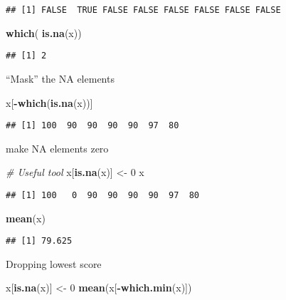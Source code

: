 \documentclass[
]{article}
\newenvironment{Shaded}{\begin{snugshade}}{\end{snugshade}}
\newcommand{\CommentTok}[1]{\textcolor[rgb]{0.56,0.35,0.01}{\textit{#1}}}
\newcommand{\DecValTok}[1]{\textcolor[rgb]{0.00,0.00,0.81}{#1}}
\newcommand{\FunctionTok}[1]{\textcolor[rgb]{0.13,0.29,0.53}{\textbf{#1}}}
\newcommand{\NormalTok}[1]{#1}
\newcommand{\OtherTok}[1]{\textcolor[rgb]{0.56,0.35,0.01}{#1}}
\newcommand{\SpecialCharTok}[1]{\textcolor[rgb]{0.81,0.36,0.00}{\textbf{#1}}}
\begin{document}
\begin{verbatim}
## [1] FALSE  TRUE FALSE FALSE FALSE FALSE FALSE FALSE
\end{verbatim}

\begin{Shaded}
\begin{Highlighting}[]
\FunctionTok{which}\NormalTok{( }\FunctionTok{is.na}\NormalTok{(x))}
\end{Highlighting}
\end{Shaded}

\begin{verbatim}
## [1] 2
\end{verbatim}

``Mask'' the NA elements

\begin{Shaded}
\begin{Highlighting}[]
\NormalTok{x[}\SpecialCharTok{{-}}\FunctionTok{which}\NormalTok{(}\FunctionTok{is.na}\NormalTok{(x))]}
\end{Highlighting}
\end{Shaded}

\begin{verbatim}
## [1] 100  90  90  90  90  97  80
\end{verbatim}

make NA elements zero

\begin{Shaded}
\begin{Highlighting}[]
\CommentTok{\# Useful tool}
\NormalTok{x[}\FunctionTok{is.na}\NormalTok{(x)] }\OtherTok{\textless{}{-}} \DecValTok{0}
\NormalTok{x}
\end{Highlighting}
\end{Shaded}

\begin{verbatim}
## [1] 100   0  90  90  90  90  97  80
\end{verbatim}

\begin{Shaded}
\begin{Highlighting}[]
\FunctionTok{mean}\NormalTok{(x)}
\end{Highlighting}
\end{Shaded}

\begin{verbatim}
## [1] 79.625
\end{verbatim}

Dropping lowest score

\begin{Shaded}
\begin{Highlighting}[]
\NormalTok{x[}\FunctionTok{is.na}\NormalTok{(x)] }\OtherTok{\textless{}{-}} \DecValTok{0}
\FunctionTok{mean}\NormalTok{(x[}\SpecialCharTok{{-}}\FunctionTok{which.min}\NormalTok{(x)])}
\end{Highlighting}
\end{Shaded}
\end{document}
